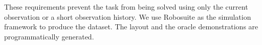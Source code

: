 These requirements prevent the task from being solved using only the current observation or a short observation history. We use Robosuite \citep{zhu2025robosuitemodularsimulationframework} as the simulation framework to produce the dataset. The layout and the oracle demonstrations are programmatically generated.
